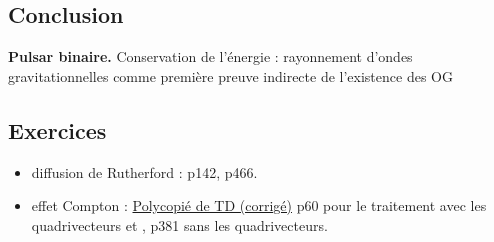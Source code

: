 \subsection*{Conclusion}

\begin{slide}
\textbf{Pulsar binaire.}
Conservation de l'énergie : rayonnement d'ondes gravitationnelles comme première preuve indirecte de l'existence des OG
\end{slide}



\subsection*{Exercices}

\begin{itemize}
\item diffusion de Rutherford : \cite{Faroux1996} p142, \cite{Michel2017} p466.
\item effet Compton : \href{http://supernovae.in2p3.fr/~llg/Enseignements/Agregation/Relativite/}{Polycopié de TD (corrigé)} p60 pour le traitement avec les quadrivecteurs et \cite{Seigne2014}, p381 sans les quadrivecteurs.
\end{itemize}

\newpage